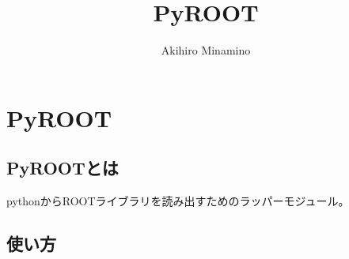 \documentclass[11pt, oneside]{article}   	%
\title{PyROOT}
\author{Akihiro Minamino}
\begin{document}
\maketitle
\section{PyROOT}
\subsection{PyROOTとは}
pythonからROOTライブラリを読み出すためのラッパーモジュール。

\subsection{使い方}
\end{document}

